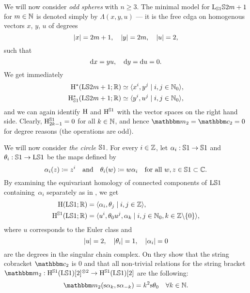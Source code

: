 \documentclass[\MainFolder/Text.tex]{subfiles}
\begin{document}
We will now consider \emph{odd spheres} with $n\ge 3$. The minimal model for $\mathrm{L}_{\mathbb{S}{1}} \mathbb{S}{2m+1}$ 
for $m\in \mathbb{N}$ is denoted simply by $\Lambda(x,y,u)$ --- it is the free cdga on homogenous vectors $x$, $y$, $u$ of degrees
$$ |x| = 2m+1, \quad |y| = 2m,\quad |u| = 2, $$
such that
$$ \mathrm{d} x = y u, \quad \mathrm{d} y = \mathrm{d} u = 0. $$
We get immediately
$$\begin{aligned}
\mathrm{H}^*(\mathrm{L} \mathbb{S}{2m+1}; \mathbb{R}) & \simeq \langle x^i, y^j \mid i, j \in \mathbb{N}_0 \rangle,  \\
\mathrm{H}_{\mathbb{S}{1}}^*(\mathrm{L} \mathbb{S}{2m+1}; \mathbb{R}) &\simeq \langle y^i, u^j \mid i,j \in \mathbb{N}_0 \rangle, \end{aligned}$$
and we can again identify $\mathrm{H}$ and $\mathrm{H}^{\mathbb{S}{1}}$ with the vector spaces on the right hand side. Clearly, $\mathrm{H}^{\mathbb{S}{1}}_{2k-1} = 0$ for all $k\in \mathbb{N}$, and hence $\StringOp_2 = \StringCoOp_2 = 0$ for degree reasons (the operations are odd).

We will now consider \emph{the circle} $\mathbb{S}{1}$. For every $i\in \mathbb{Z}$, let $\alpha_i : \mathbb{S}{1} \rightarrow \mathbb{S}{1}$ and $\theta_i : \mathbb{S}{1} \rightarrow \mathrm{L} \mathbb{S}{1}$ be the maps defined by
$$ \alpha_i(z) \coloneqq z^i\quad\text{and}\quad\theta_i(w) \coloneqq w \alpha_i \quad \text{for all }w,z\in \mathbb{S}{1}\subset \mathbb{C}. $$
By examining the equivariant homology of connected components of $\mathrm{L} \mathbb{S}{1}$ containing~$\alpha_i$ separately as in \cite[Section 2.1.4]{Basu2011}, we get 
$$\begin{aligned}
\mathrm{H}(\mathrm{L} \mathbb{S}{1}; \mathbb{R}) &=\langle \alpha_i, \theta_j \mid i,j\in \mathbb{Z}\rangle, \\
\mathrm{H}^{\mathbb{S}{1}}(\mathrm{L} \mathbb{S}{1}; \mathbb{R}) &= \langle u^i, \theta_0 u^j, \alpha_k \mid i, j \in \mathbb{N}_0, k\in \mathbb{Z}\backslash\{0\} \rangle,
\end{aligned}$$
where $u$ corresponds to the Euler class and
$$ |u| = 2, \quad |\theta_i| =1, \quad |\alpha_i| = 0 $$
are the degrees in the singular chain complex. On \cite[p. 21]{Basu2011} they show that the string cobracket $\StringCoOp_2$ is $0$ and that all non-trivial relations for the string bracket $\StringOp_2: \StringH(\Loop \Sph{1})[2]^{\otimes 2}\rightarrow \StringH(\Loop \Sph{1})[2]$ are the following:
\begin{equation*}
\StringOp_2( \Susp \alpha_{k}, \Susp \alpha_{-k}) = k^2 \Susp\theta_0 \quad\forall k \in \N.
\end{equation*}
\end{document}
